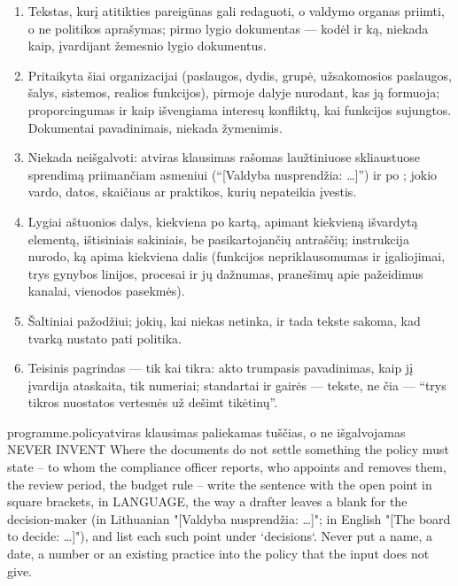 \begin{enumerate}[itemsep=1pt, topsep=3pt]
  \item Tekstas, kurį atitikties pareigūnas gali redaguoti, o valdymo organas priimti, o ne
    politikos aprašymas; pirmo lygio dokumentas --- kodėl ir ką, niekada kaip, įvardijant
    žemesnio lygio dokumentus.
  \item Pritaikyta šiai organizacijai (paslaugos, dydis, grupė, užsakomosios paslaugos, šalys,
    sistemos, realios funkcijos), pirmoje dalyje nurodant, kas ją formuoja; proporcingumas ir
    kaip išvengiama interesų konfliktų, kai funkcijos sujungtos. Dokumentai pavadinimais,
    niekada žymenimis.
  \item Niekada neišgalvoti: atviras klausimas rašomas laužtiniuose skliaustuose sprendimą
    priimančiam asmeniui (\enquote{[Valdyba nusprendžia: …]}) ir po ; jokio
    vardo, datos, skaičiaus ar praktikos, kurių nepateikia įvestis.
  \item Lygiai aštuonios dalys, kiekviena po kartą, apimant kiekvieną išvardytą elementą, ištisiniais
    sakiniais, be pasikartojančių antraščių; instrukcija nurodo, ką apima kiekviena dalis
    (funkcijos nepriklausomumas ir įgaliojimai, trys gynybos linijos, procesai ir jų dažnumas,
    pranešimų apie pažeidimus kanalai, vienodos pasekmės).
  \item Šaltiniai pažodžiui; jokių, kai niekas netinka, ir tada tekste sakoma, kad tvarką
    nustato pati politika.
  \item Teisinis pagrindas --- tik kai tikra: akto trumpasis pavadinimas, kaip jį įvardija
    ataskaita, tik numeriai; standartai ir gairės --- tekste, ne čia ---
    \enquote{trys tikros nuostatos vertesnės už dešimt tikėtinų}.
\end{enumerate}

\par\nopagebreak
\begin{promptexcerpt}{programme.policy}{atviras klausimas paliekamas tuščias, o ne išgalvojamas}
NEVER INVENT
Where the documents do not settle something the policy must state – to whom the compliance officer reports, who appoints and removes them, the review period, the budget rule – write the sentence with the open point in square brackets, in {LANGUAGE}, the way a drafter leaves a blank for the decision-maker (in Lithuanian "[Valdyba nusprendžia: …]"; in English "[The board to decide: …]"), and list each such point under `decisions`. Never put a name, a date, a number or an existing practice into the policy that the input does not give.
\end{promptexcerpt}

